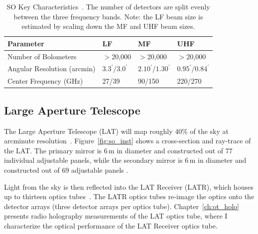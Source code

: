 \begin{table}[b]
    \centering
    \begin{tabular}{|l|l|l|l|} \hline
        \textbf{ Parameter} &  \textbf{LF} &  \textbf{MF}  &  \textbf{UHF}  \\ \hline \hline
        Number of Bolometers & $>$20,000& $>$20,000& $>$20,000\\\hline
        Angular Resolution (arcmin) & $3.3^{\prime}/3.0^{\prime}$ &$2.10^{\prime}/1.30^{\prime}$&$0.95^{\prime}/0.84^{\prime}$\\\hline
        Center Frequency (GHz) & 27/39 & 90/150 & 220/270\\\hline
    \end{tabular} \caption{SO Key Characteristics~\cite{Gudmundsson:21}.  The number of detectors are split evenly between the three frequency bands.  Note: the LF beam size is estimated by scaling down the MF and UHF beam sizes.}
    \label{tab:so}
\end{table}

\subsection{Large Aperture Telescope}

The Large Aperture Telescope (LAT) will map roughly 40\% of the sky at arcminute resolution~\cite{xu/etal:2020c}.   Figure~\ref{fig:so_inst} shows a cross-section and ray-trace of the LAT.  The primary mirror is 6\,m in diameter and constructed out of 77 individual adjustable panels, while the secondary mirror is 6\,m in diameter and constructed out of 69 adjustable panels \cite{gali18}.

Light from the sky is then reflected into the LAT Receiver (LATR), which houses up to thirteen optics tubes~\cite{Xu_2021}.  The LATR optics tubes re-image the optics onto the detector arrays (three detector arrays per optics tube).  Chapter~\ref{ch:ot_holo} presents radio holography measurements of the LAT optics tube, where I characterize the optical performance of the LAT Receiver optics tube.

